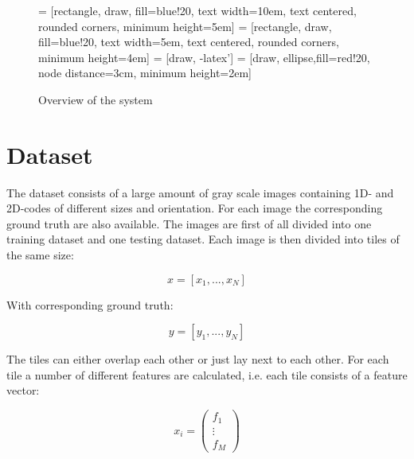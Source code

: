 \begin{figure}[H]
\centering
{} = [rectangle, draw, fill=blue!20, 
    text width=10em, text centered, rounded corners, minimum height=5em]
 = [rectangle, draw, fill=blue!20, 
    text width=5em, text centered, rounded corners, minimum height=4em]
 = [draw, -latex']
 = [draw, ellipse,fill=red!20, node distance=3cm,
    minimum height=2em]
    
\caption{Overview of the system}
\label{system}
\end{figure}

\section{Dataset}
\label{Dataset}
The dataset consists of a large amount of gray scale images containing 1D- and 2D-codes of different sizes and orientation. For each image the corresponding ground truth are also available. The images are first of all divided into one training dataset and one testing dataset. Each image is then divided into tiles of the same size: 
\begin{center}
\begin{equation}
	x = [x_1,...,x_N]
\end{equation}
\end{center}
With corresponding ground truth:
\begin{center}
\begin{equation}
	y = [y_1,...,y_N]
\end{equation}
\end{center}
The tiles can either overlap each other or just lay next to each other. For each tile a number of different features are calculated, i.e. each tile consists of a feature vector:
\begin{center}
\begin{equation}
	x_i =  
	\begin{pmatrix}
		 f_1 \\ \vdots \\ f_M
	\end{pmatrix}
\end{equation}
\end{center}  

